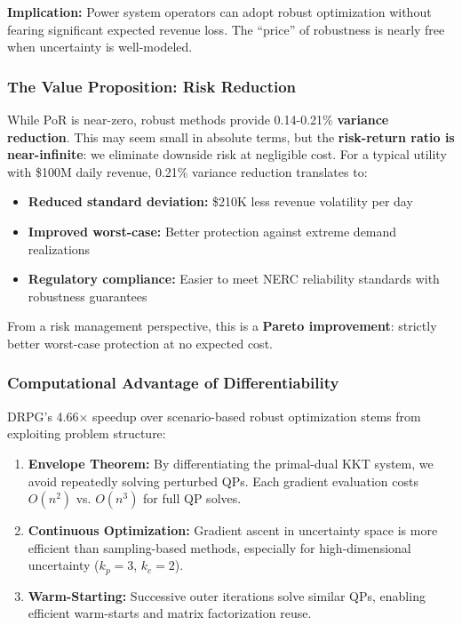 \textbf{Implication:} Power system operators can adopt robust optimization without fearing significant expected revenue loss. The ``price'' of robustness is nearly free when uncertainty is well-modeled.

\subsubsection{The Value Proposition: Risk Reduction}

While PoR is near-zero, robust methods provide 0.14-0.21\% \textbf{variance reduction}. This may seem small in absolute terms, but the \textbf{risk-return ratio is near-infinite}: we eliminate downside risk at negligible cost. For a typical utility with \$100M daily revenue, 0.21\% variance reduction translates to:
\begin{itemize}
    \item \textbf{Reduced standard deviation:} \$210K less revenue volatility per day
    \item \textbf{Improved worst-case:} Better protection against extreme demand realizations
    \item \textbf{Regulatory compliance:} Easier to meet NERC reliability standards with robustness guarantees
\end{itemize}

From a risk management perspective, this is a \textbf{Pareto improvement}: strictly better worst-case protection at no expected cost.

\subsubsection{Computational Advantage of Differentiability}

DRPG's 4.66$\times$ speedup over scenario-based robust optimization stems from exploiting problem structure:

\begin{enumerate}
    \item \textbf{Envelope Theorem:} By differentiating the primal-dual KKT system, we avoid repeatedly solving perturbed QPs. Each gradient evaluation costs $O(n^2)$ vs. $O(n^3)$ for full QP solves.

    \item \textbf{Continuous Optimization:} Gradient ascent in uncertainty space is more efficient than sampling-based methods, especially for high-dimensional uncertainty ($k_p = 3$, $k_c = 2$).

    \item \textbf{Warm-Starting:} Successive outer iterations solve similar QPs, enabling efficient warm-starts and matrix factorization reuse.
\end{enumerate}

